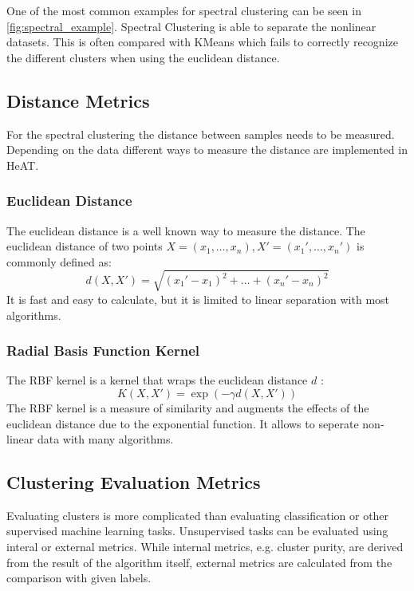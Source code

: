 One of the most common examples for spectral clustering can be seen in \cref{fig:spectral_example}. Spectral Clustering is able to
separate the nonlinear datasets. This is often compared with KMeans which fails to correctly recognize the different clusters when using the euclidean distance.

\subsection{Distance Metrics}
\label{subsec:distance_metrics}
For the spectral clustering the distance between samples needs to be measured. Depending on the data different ways to measure the distance are implemented in \gls{HeAT}.

\subsubsection{Euclidean Distance}
The euclidean distance is a well known way to measure the distance. The euclidean distance of two points \(X = (x_1, \ldots, x_n ), X' = (x_1', \ldots, x_n')\) is commonly defined  as:
\[
  d\left(X, X'\right) = \sqrt{{(x_1' - x_1)}^2 + \ldots + {(x_n' - x_n)}^2}
\]
It is fast and easy to calculate, but it is limited to  linear separation with most algorithms.

\subsubsection{Radial Basis Function Kernel}
The RBF kernel is a kernel that wraps the euclidean distance \(d\) \cite{vert_primer_2004}:
\[
  K\left(X, X'\right) = \exp(-\gamma d(X, X'))
\]
The RBF kernel is a measure of similarity and augments the effects of the euclidean distance due to the exponential function.
It allows to seperate non-linear data with many algorithms.


\subsection{Clustering Evaluation Metrics}
\label{subsec:clustering_evaluation_metrics}

Evaluating clusters is more complicated than evaluating classification or other supervised machine learning tasks.
Unsupervised tasks can be evaluated using interal or external metrics.
While internal metrics, e.g. cluster purity, are derived from the result of the algorithm itself, external metrics are calculated from the comparison with given labels.

